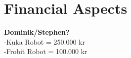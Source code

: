 \chapter{Financial Aspects}\label{chap:financial_aspects_chapter}

\textbf{Dominik/Stephen?}\\

-Kuka Robot = 250.000 kr\\
-Frobit Robot = 100.000 kr\\

